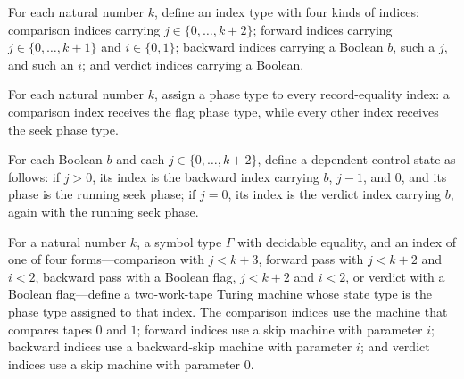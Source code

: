\begin{definition}
\label{Turing.RecordEqIndex}
\leanok
For each natural number $k$, define an index type with four kinds of indices: comparison
indices carrying $j\in\{0,\ldots,k+2\}$; forward indices carrying $j\in\{0,\ldots,k+1\}$
and $i\in\{0,1\}$; backward indices carrying a Boolean $b$, such a $j$, and such an $i$;
and verdict indices carrying a Boolean.
\end{definition}

\begin{definition}
\label{Turing.recordEqPhase}
\leanok
{}
For each natural number $k$, assign a phase type to every record-equality index: a
comparison index receives the flag phase type, while every other index receives the seek
phase type.
\end{definition}

\begin{definition}
\label{Turing.recordEqBack}
\leanok
{}
For each Boolean $b$ and each $j\in\{0,\ldots,k+2\}$, define a dependent control state
as follows: if $j>0$, its index is the backward index carrying $b$, $j-1$, and $0$, and
its phase is the running seek phase; if $j=0$, its index is the verdict index carrying
$b$, again with the running seek phase.
\end{definition}

\begin{definition}
\label{Turing.recordEqRows}
\leanok
{}
For a natural number $k$, a symbol type $\Gamma$ with decidable equality, and an
index of one of four forms—comparison with $j<k+3$, forward pass with $j<k+2$ and $i<2$,
backward pass with a Boolean flag, $j<k+2$ and $i<2$, or verdict with a Boolean
flag—define a two-work-tape Turing machine whose state type is the phase type assigned
to that index. The comparison indices use the machine that compares tapes $0$ and $1$;
forward indices use a skip machine with parameter $i$; backward indices use a
backward-skip machine with parameter $i$; and verdict indices use a skip machine with
parameter $0$.
\end{definition}


